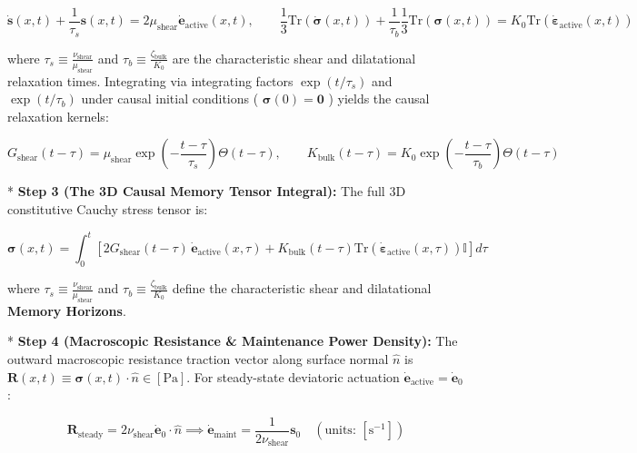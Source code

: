 \documentclass[11pt,a4paper]{article}
\theoremstyle{definition}
\theoremstyle{remark}
\begin{document}
\begin{equation}
\boxed{\dot{\mathbf{s}}(x, t) + \frac{1}{\tau_s} \mathbf{s}(x, t) = 2 \mu_{\text{shear}} \dot{\mathbf{e}}_{\text{active}}(x, t), \qquad \frac{1}{3}\mathrm{Tr}(\dot{\boldsymbol{\sigma}}(x, t)) + \frac{1}{\tau_b} \frac{1}{3}\mathrm{Tr}(\boldsymbol{\sigma}(x, t)) = K_0 \mathrm{Tr}(\dot{\boldsymbol{\varepsilon}}_{\text{active}}(x, t))}
\end{equation}


where $\tau_s \equiv \frac{\nu_{\text{shear}}}{\mu_{\text{shear}}}$ and $\tau_b \equiv \frac{\zeta_{\text{bulk}}}{K_0}$ are the characteristic shear and dilatational relaxation times.
Integrating via integrating factors $\exp(t/\tau_s)$ and $\exp(t/\tau_b)$ under causal initial conditions ( $\boldsymbol{\sigma}(0) = \mathbf{0}$ ) yields the causal relaxation kernels:


\begin{equation}
G_{\text{shear}}(t - \tau) = \mu_{\text{shear}} \exp\left( -\frac{t - \tau}{\tau_s} \right) \Theta(t - \tau), \qquad K_{\text{bulk}}(t - \tau) = K_0 \exp\left( -\frac{t - \tau}{\tau_b} \right) \Theta(t - \tau)
\end{equation}


* \textbf{Step 3 (The 3D Causal Memory Tensor Integral):}
The full 3D constitutive Cauchy stress tensor is:


\begin{equation}
\boxed{\boldsymbol{\sigma}(x, t) = \int_0^t [ 2 G_{\text{shear}}(t - \tau) \, \dot{\mathbf{e}}_{\text{active}}(x, \tau) + K_{\text{bulk}}(t - \tau) \mathrm{Tr}(\dot{\boldsymbol{\varepsilon}}_{\text{active}}(x, \tau)) \mathbb{I} ] d\tau}
\end{equation}


where $\tau_s \equiv \frac{\nu_{\text{shear}}}{\mu_{\text{shear}}}$ and $\tau_b \equiv \frac{\zeta_{\text{bulk}}}{K_0}$ define the characteristic shear and dilatational \textbf{Memory Horizons}.

* \textbf{Step 4 (Macroscopic Resistance \& Maintenance Power Density):}
The outward macroscopic resistance traction vector along surface normal $\hat{n}$ is $\mathbf{R}(x, t) \equiv \boldsymbol{\sigma}(x, t) \cdot \hat{n} \in [\mathrm{Pa}]$. For steady-state deviatoric actuation $\dot{\mathbf{e}}_{\text{active}} = \dot{\mathbf{e}}_0$:


\begin{equation}
\mathbf{R}_{\text{steady}} = 2 \nu_{\text{shear}} \dot{\mathbf{e}}_0 \cdot \hat{n} \implies \dot{\mathbf{e}}_{\text{maint}} = \frac{1}{2\nu_{\text{shear}}} \mathbf{s}_0 \quad \left( \text{units: } [\mathrm{s}^{-1}] \right)
\end{equation}
\end{document}
